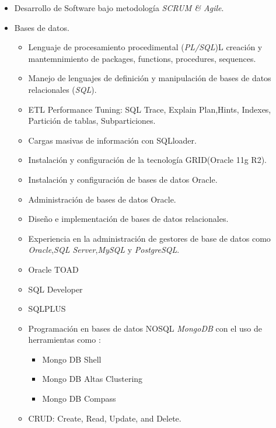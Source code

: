 \documentclass[21pt, onecolumn]{article} %
\begin{document}
\begin{itemize}
\item Desarrollo de Software bajo metodología \emph{SCRUM \& Agile}.
\item Bases de datos.
\begin{itemize}
 \item Lenguaje de procesamiento procedimental (\emph{PL/SQL})L creación y mantemnimiento de packages, functions, procedures, sequences.
  \item Manejo de lenguajes de definición y manipulación de bases de datos
relacionales (\emph{SQL}).
 \item ETL Performance Tuning: SQL Trace, Explain Plan,Hints, Indexes,
  Partición de  tablas, Subparticiones.
 \item Cargas masivas de información  con SQLloader.
 \item Instalación y configuración de la tecnología GRID(Oracle 11g R2).
 \item Instalación y configuración de bases de datos Oracle.
 \item Administración de bases de  datos Oracle.
 \item Diseño e implementación de bases de datos relacionales. 

 \item Experiencia en la administración de gestores de base de datos como
\emph{Oracle},\emph{SQL Server},\emph{MySQL} y \emph{PostgreSQL}.
  \item Oracle TOAD
  \item SQL Developer
  \item SQLPLUS
 \item Programación en  bases de datos NOSQL \emph{MongoDB}  con el uso de herramientas como :
 \begin{itemize}
  \item Mongo DB Shell
  \item Mongo DB Altas Clustering
  \item Mongo DB Compass
 \end{itemize}
 \item CRUD: Create, Read, Update, and Delete.
\end{itemize}


\end{itemize}
\end{document}
